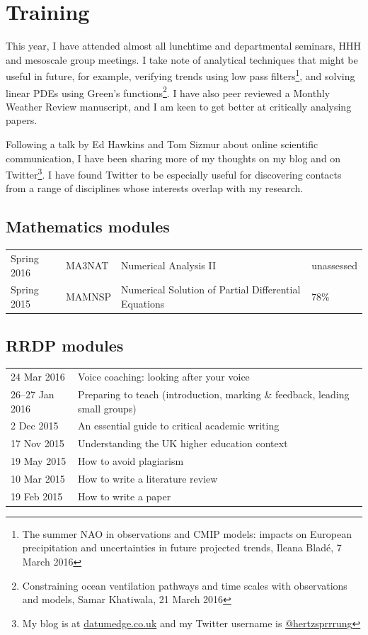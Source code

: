 \documentclass[a4paper,11pt]{article}
\begin{document}
\section{Training}
This year, I have attended almost all lunchtime and departmental seminars, HHH and mesoscale group meetings.  I take note of analytical techniques that might be useful in future, for example, verifying trends using low pass filters\footnote{The summer NAO in observations and CMIP models: impacts on European precipitation and uncertainties in future projected trends, Ileana Bladé, 7 March 2016}, and solving linear PDEs using Green's functions\footnote{Constraining ocean ventilation pathways and time scales with observations and models, Samar Khatiwala, 21 March 2016}.
I have also peer reviewed a Monthly Weather Review manuscript, and I am keen to get better at critically analysing papers.

Following a talk by Ed Hawkins and Tom Sizmur about online scientific communication, I have been sharing more of my thoughts on my blog and on Twitter\footnote{My blog is at \url{datumedge.co.uk} and my Twitter username is \href{https://twitter.com/hertzsprrrung}{@hertzsprrrung}}.  I have found Twitter to be especially useful for discovering contacts from a range of disciplines whose interests overlap with my research.

\subsection*{Mathematics modules}
\footnotesize
\begin{tabular}{l l l l}
Spring 2016	& MA3NAT & Numerical Analysis II & unassessed \\
Spring 2015	& MAMNSP & Numerical Solution of Partial Differential Equations  & 78\% \\
\end{tabular}

\subsection*{RRDP modules}
\begin{tabular}{l l}
24 Mar 2016	& Voice coaching: looking after your voice \\
26--27 Jan 2016 & Preparing to teach (introduction, marking \& feedback, leading small groups) \\
2 Dec 2015	& An essential guide to critical academic writing \\
17 Nov 2015	& Understanding the UK higher education context \\
19 May 2015	& How to avoid plagiarism \\
10 Mar 2015	& How to write a literature review \\
19 Feb 2015	& How to write a paper \\
\end{tabular}
\end{document}
